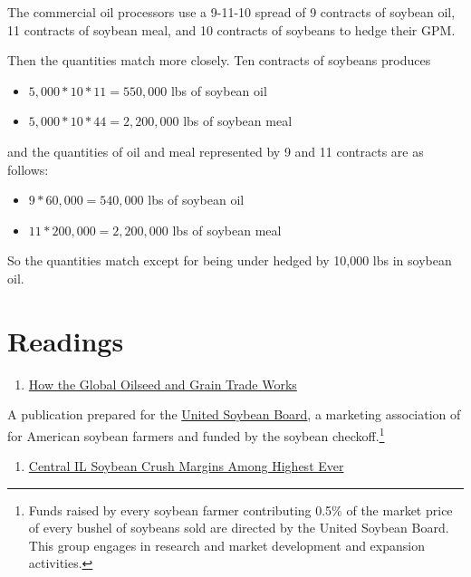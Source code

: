 \documentclass[
  letterpaper,
  DIV=11,
  numbers=noendperiod]{scrreprt}
\providecommand{\tightlist}{%
  \setlength{\itemsep}{0pt}\setlength{\parskip}{0pt}}\usepackage{longtable,booktabs,array}
\begin{document}
The commercial oil processors use a 9-11-10 spread of 9 contracts of
soybean oil, 11 contracts of soybean meal, and 10 contracts of soybeans
to hedge their GPM.

Then the quantities match more closely. Ten contracts of soybeans
produces

\begin{itemize}
\tightlist
\item
  \(5,000*10*11 = 550,000\) lbs of soybean oil
\item
  \(5,000*10*44 = 2,200,000\) lbs of soybean meal
\end{itemize}

and the quantities of oil and meal represented by 9 and 11 contracts are
as follows:

\begin{itemize}
\tightlist
\item
  \(9*60,000 = 540,000\) lbs of soybean oil
\item
  \(11*200,000 = 2,200,000\) lbs of soybean meal
\end{itemize}

So the quantities match except for being under hedged by 10,000 lbs in
soybean oil.

\hypertarget{readings-4}{%
\section{Readings}\label{readings-4}}

\begin{enumerate}
\def\labelenumi{\arabic{enumi}.}
\tightlist
\item
  \href{http://unitedsoybean.org/wp-content/uploads/2013/07/RevisedJan12_GlobalOilSeedGrainTrade_2011.pdf}{How
  the Global Oilseed and Grain Trade Works}
\end{enumerate}

A publication prepared for the \href{http://unitedsoybean.org/}{United
Soybean Board}, a marketing association of for American soybean farmers
and funded by the soybean checkoff.\footnote{Funds raised by every
  soybean farmer contributing 0.5\% of the market price of every bushel
  of soybeans sold are directed by the United Soybean Board. This group
  engages in research and market development and expansion activities.}

\begin{enumerate}
\def\labelenumi{\arabic{enumi}.}
\setcounter{enumi}{1}
\tightlist
\item
  \href{http://www.dtnprogressivefarmer.com/dtnag/common/link.do;jsessionid=CA98693F5E3C9EF37EC1F032464A6388.agfreejvm1?symbolicName=/ag/blogs/template1\&blogHandle=agfundamental\&blogEntryId=8a82c0bc372e8fba0137a8324dd704cf}{Central
  IL Soybean Crush Margins Among Highest Ever}
\end{enumerate}
\end{document}
